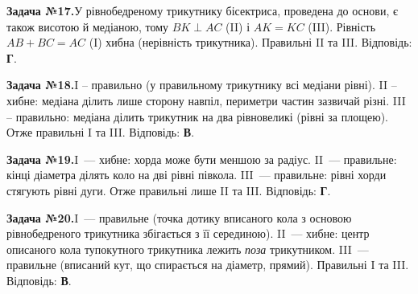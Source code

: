 \documentclass[12pt]{article}
\begin{document}
\begin{tcolorbox}[colback=titleBg!40, colframe=mainGreen!55, boxrule=0.4pt, arc=2pt, left=6pt, right=6pt, top=4pt, bottom=4pt, breakable]
\noindent\small\textbf{Задача №17.}\quad У рівнобедреному трикутнику бісектриса, проведена до основи, є також висотою й медіаною, тому $BK\perp AC$ (II) і $AK=KC$ (III). Рівність $AB+BC=AC$ (I) хибна (нерівність трикутника). Правильні II та III. Відповідь: \textbf{Г}.
\par\vspace{0.1cm}\hfill\hyperlink{task:17}{}
\end{tcolorbox}
\par\vspace{0.3cm}\noindent\hypertarget{sol:18}{}
\begin{tcolorbox}[colback=titleBg!40, colframe=mainGreen!55, boxrule=0.4pt, arc=2pt, left=6pt, right=6pt, top=4pt, bottom=4pt, breakable]
\noindent\small\textbf{Задача №18.}\quad I -- правильно (у правильному трикутнику всі медіани рівні). II -- хибне: медіана ділить лише сторону навпіл, периметри частин зазвичай різні. III -- правильно: медіана ділить трикутник на два рівновеликі (рівні за площею). Отже правильні I та III. Відповідь: \textbf{В}.
\par\vspace{0.1cm}\hfill\hyperlink{task:18}{}
\end{tcolorbox}
\par\vspace{0.3cm}\noindent\hypertarget{sol:19}{}
\begin{tcolorbox}[colback=titleBg!40, colframe=mainGreen!55, boxrule=0.4pt, arc=2pt, left=6pt, right=6pt, top=4pt, bottom=4pt, breakable]
\noindent\small\textbf{Задача №19.}\quad I~--- хибне: хорда може бути меншою за радіус. II~--- правильне: кінці діаметра ділять коло на дві рівні півкола. III~--- правильне: рівні хорди стягують рівні дуги. Отже правильні лише II та III. Відповідь: \textbf{Г}.
\par\vspace{0.1cm}\hfill\hyperlink{task:19}{}
\end{tcolorbox}
\par\vspace{0.3cm}\noindent\hypertarget{sol:20}{}
\begin{tcolorbox}[colback=titleBg!40, colframe=mainGreen!55, boxrule=0.4pt, arc=2pt, left=6pt, right=6pt, top=4pt, bottom=4pt, breakable]
\noindent\small\textbf{Задача №20.}\quad I~--- правильне (точка дотику вписаного кола з основою рівнобедреного трикутника збігається з її серединою). II~--- хибне: центр описаного кола тупокутного трикутника лежить \emph{поза} трикутником. III~--- правильне (вписаний кут, що спирається на діаметр, прямий). Правильні I та III. Відповідь: \textbf{В}.
\par\vspace{0.1cm}\hfill\hyperlink{task:20}{}
\end{tcolorbox}
\end{document}
